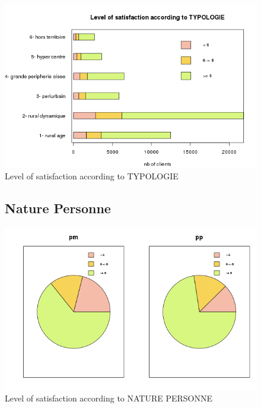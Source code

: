 \documentclass[a4paper, 11pt]{article}
\begin{document}
        \begin{figure}[!ht]
        	\centering
                \includegraphics[height = 10 cm]{Remi/Level_of_satisfaction_according_to_TYPOLOGIE.png}
                \caption{Level of satisfaction according to TYPOLOGIE}
                \label{fig:TYPOLOGIE}
        \end{figure}

        \begin{figure}[!ht]
        \subsection{Nature Personne}
        	\centering
                \includegraphics[width = 10 cm]{Remi/Level_of_satisfaction_according_to_NATURE_PERSONNE2.png}
                \caption{Level of satisfaction according to NATURE PERSONNE}
                \label{fig:NATURE_PERSONNE2}
        \end{figure}
\end{document}
